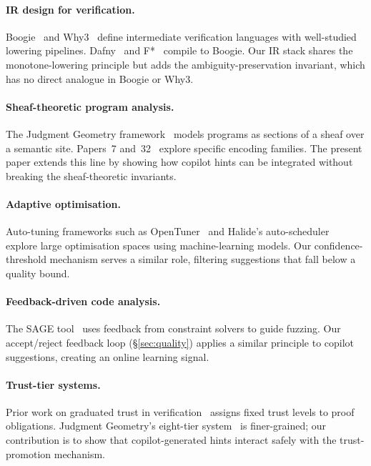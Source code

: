 \documentclass[11pt]{article}
\begin{document}
\paragraph{IR design for verification.}
Boogie~\cite{barnett2006boogie} and Why3~\cite{filliatre2013why3}
define intermediate verification languages with well-studied lowering
pipelines.  Dafny~\cite{leino2010dafny} and
F*~\cite{swamy2016dependent} compile to Boogie.  Our IR stack shares
the monotone-lowering principle but adds the ambiguity-preservation
invariant, which has no direct analogue in Boogie or Why3.

\paragraph{Sheaf-theoretic program analysis.}
The Judgment Geometry framework~\cite{young2024jugeo} models programs
as sections of a sheaf over a semantic site.  Papers~7
and~32~\cite{young2024effects,young2024sequences} explore specific
encoding families.  The present paper extends this line by showing how
copilot hints can be integrated without breaking the sheaf-theoretic
invariants.

\paragraph{Adaptive optimisation.}
Auto-tuning frameworks such as OpenTuner~\cite{ansel2014opentuner} and
Halide's auto-scheduler~\cite{adams2019halide} explore large
optimisation spaces using machine-learning models.  Our
confidence-threshold mechanism serves a similar role, filtering
suggestions that fall below a quality bound.

\paragraph{Feedback-driven code analysis.}
The SAGE tool~\cite{godefroid2012sage} uses feedback from constraint
solvers to guide fuzzing.  Our accept/reject feedback loop
(\S\ref{sec:quality}) applies a similar principle to copilot
suggestions, creating an online learning signal.

\paragraph{Trust-tier systems.}
Prior work on graduated trust in
verification~\cite{leino2010dafny,swamy2016dependent} assigns
fixed trust levels to proof obligations.  Judgment Geometry's
eight-tier system~\cite{young2024jugeo} is finer-grained; our
contribution is to show that copilot-generated hints interact safely
with the trust-promotion mechanism.
\end{document}
